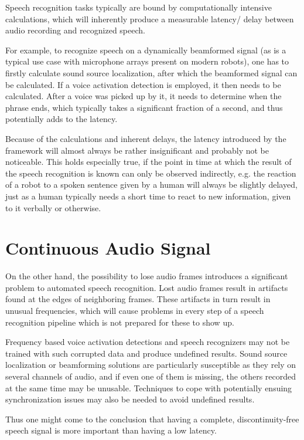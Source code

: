 Speech recognition tasks typically are bound by computationally intensive calculations, which will inherently produce a measurable latency/ delay between audio recording and recognized speech.  
	
For example, to recognize speech on a dynamically beamformed signal (as is a typical use case with microphone arrays present on modern robots), one has to firstly calculate sound source localization, after which the beamformed signal can be calculated.
If a voice activation detection is employed, it then needs to be calculated. 
After a voice was picked up by it, it needs to determine when the phrase ends, which typically takes a significant fraction of a second, and thus potentially adds to the latency. 
	
Because of the calculations and inherent delays, the latency introduced by the framework will almost always be rather insignificant and probably not be noticeable. 
This holds especially true, if the point in time at which the result of the speech recognition is known can only be observed indirectly, e.g. the reaction of a robot to a spoken sentence given by a human will always be slightly delayed, just as a human typically needs a short time to react to new information, given to it verbally or otherwise.

\section{Continuous Audio Signal}
On the other hand, the possibility to lose audio frames introduces a significant problem to automated speech recognition.
Lost audio frames result in artifacts found at the edges of neighboring frames. 
These artifacts in turn result in unusual frequencies, which will cause problems in every step of a speech recognition pipeline which is not prepared for these to show up. 

Frequency based voice activation detections and speech recognizers may not be trained with such corrupted data and produce undefined results.
Sound source localization or beamforming solutions are particularly susceptible as they rely on several channels of audio, and if even one of them is missing, the others recorded at the same time may be unusable.
Techniques to cope with potentially ensuing synchronization issues may also be needed to avoid undefined results.
	
Thus one might come to the conclusion that having a complete, discontinuity-free speech signal is more important than having a low latency.

